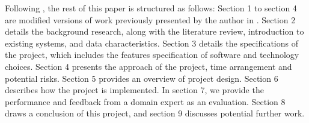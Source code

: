 Following \cite{Laramee2011}, the rest of this paper is structured as follows: Section 1 to section 4 are modified versions of work previously presented by the author in \cite{Liu}. Section 2 details the background research, along with the literature review, introduction to existing systems, and data characteristics. Section 3 details the specifications of the project, which includes the features specification of software and technology choices. Section 4 presents the approach of the project, time arrangement and potential risks. Section 5 provides an overview of project design. Section 6 describes how the project is implemented. In section 7, we provide the performance and feedback from a domain expert as an evaluation. Section 8 draws a conclusion of this project, and section 9 discusses potential further work. 



